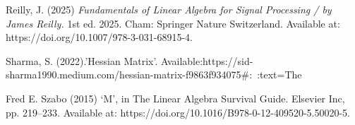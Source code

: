 \documentclass[a4paper]{report}
\begin{document}
Reilly, J. (2025) \textit{Fundamentals of Linear Algebra for Signal Processing / by James Reilly.} 1st ed. 2025. Cham: Springer Nature Switzerland. Available at: https://doi.org/10.1007/978-3-031-68915-4.

Sharma, S. (2022).'Hessian Matrix'. \newline Available:https://sid-sharma1990.medium.com/hessian-matrix-f9863f934075#:~:text=The%

Fred E. Szabo (2015) ‘M’, in The Linear Algebra Survival Guide. Elsevier Inc, pp. 219–233. Available at: https://doi.org/10.1016/B978-0-12-409520-5.50020-5.
\end{document}
